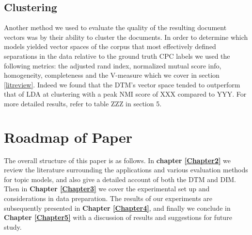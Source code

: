 

\subsection{Clustering}
Another method we used to evaluate the quality of the resulting document vectors was by their ability to cluster the documents. In order to determine which models yielded vector spaces of the corpus that most effectively defined separations in the data relative to the ground truth CPC labels we used the following metrics: the adjusted rand index, normalized mutual score info, homogeneity, completeness and the V-measure which we cover in section \ref{litreview}. Indeed we found that the DTM's vector space tended to outperform that of LDA at clustering with a peak NMI score of XXX compared to YYY. For more detailed results, refer to table ZZZ in section 5. 


 


\section{Roadmap of Paper}
The overall structure of this paper is as follows. In \textbf{chapter \ref{Chapter2}} we review the literature surrounding the applications and various evaluation methods for topic models,  and also give a detailed account of both the DTM and DIM.
Then in \textbf{Chapter \ref{Chapter3}} we cover the experimental set up and considerations in data preparation. The results of our experiments are subsequently presented in \textbf{Chapter \ref{Chapter4}}, and finally we conclude in \textbf{Chapter \ref{Chapter5}} with a discussion of results and suggestions for future study.




